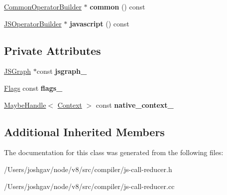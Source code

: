 \begin{DoxyCompactItemize}
\item 
\hyperlink{classv8_1_1internal_1_1compiler_1_1_common_operator_builder}{Common\+Operator\+Builder} $\ast$ {\bfseries common} () const \hypertarget{classv8_1_1internal_1_1compiler_1_1_j_s_call_reducer_a256c9ebd5661292351d23c2682120874}{}\label{classv8_1_1internal_1_1compiler_1_1_j_s_call_reducer_a256c9ebd5661292351d23c2682120874}

\item 
\hyperlink{classv8_1_1internal_1_1compiler_1_1_j_s_operator_builder}{J\+S\+Operator\+Builder} $\ast$ {\bfseries javascript} () const \hypertarget{classv8_1_1internal_1_1compiler_1_1_j_s_call_reducer_aea57d0baabeb610eaa43a62a3f6bb2fc}{}\label{classv8_1_1internal_1_1compiler_1_1_j_s_call_reducer_aea57d0baabeb610eaa43a62a3f6bb2fc}

\end{DoxyCompactItemize}
\subsection*{Private Attributes}
\begin{DoxyCompactItemize}
\item 
\hyperlink{classv8_1_1internal_1_1compiler_1_1_j_s_graph}{J\+S\+Graph} $\ast$const {\bfseries jsgraph\+\_\+}\hypertarget{classv8_1_1internal_1_1compiler_1_1_j_s_call_reducer_ab075fd19ded792191508fbc8a00a3f04}{}\label{classv8_1_1internal_1_1compiler_1_1_j_s_call_reducer_ab075fd19ded792191508fbc8a00a3f04}

\item 
\hyperlink{classv8_1_1base_1_1_flags}{Flags} const {\bfseries flags\+\_\+}\hypertarget{classv8_1_1internal_1_1compiler_1_1_j_s_call_reducer_a65f8c707b6da10c8c39513c0fe56e109}{}\label{classv8_1_1internal_1_1compiler_1_1_j_s_call_reducer_a65f8c707b6da10c8c39513c0fe56e109}

\item 
\hyperlink{classv8_1_1internal_1_1_maybe_handle}{Maybe\+Handle}$<$ \hyperlink{classv8_1_1internal_1_1_context}{Context} $>$ const {\bfseries native\+\_\+context\+\_\+}\hypertarget{classv8_1_1internal_1_1compiler_1_1_j_s_call_reducer_a3c738122f30e1f970d84a5eba6684db7}{}\label{classv8_1_1internal_1_1compiler_1_1_j_s_call_reducer_a3c738122f30e1f970d84a5eba6684db7}

\end{DoxyCompactItemize}
\subsection*{Additional Inherited Members}


The documentation for this class was generated from the following files\+:\begin{DoxyCompactItemize}
\item 
/\+Users/joshgav/node/v8/src/compiler/js-\/call-\/reducer.\+h\item 
/\+Users/joshgav/node/v8/src/compiler/js-\/call-\/reducer.\+cc\end{DoxyCompactItemize}
